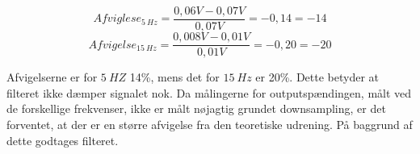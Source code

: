 \begin{equation} \label{equ:afvigelse1}
Afviglese_{5~Hz} = \frac{0,06V-0,07V}{0,07V} = -0,14  = - 14%
\end{equation}
\begin{equation} \label{equ:afvigelse2}
Afvigelse_{15~Hz} = \frac{0,008V-0,01V}{0,01V} = -0,20  = -20%
\end{equation}

\noindent 
Afvigelserne er for $5~HZ$ 14\%, mens det for $15~Hz$ er 20\%. Dette betyder at filteret ikke dæmper signalet nok. Da målingerne for outputspændingen, målt ved de forskellige frekvenser, ikke er målt nøjagtig grundet downsampling, er det forventet, at der er en større afvigelse fra den teoretiske udrening. På baggrund af dette godtages filteret. 
